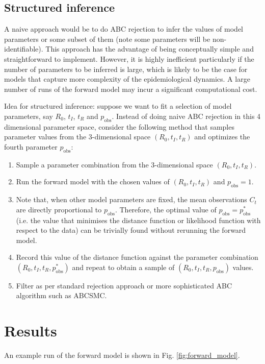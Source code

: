 \documentclass[12pt]{article}
\begin{document}
\subsection*{Structured inference}
A naive approach would be to do ABC rejection to infer the values of model parameters or some subset of them (note some parameters will be non-identifiable). This approach has the advantage of being conceptually simple and straightforward to implement. However, it is highly inefficient particularly if the number of parameters to be inferred is large, which is likely to be the case for models that capture more complexity of the epidemiological dynamics. A large number of runs of the forward model may incur a significant computational cost. 

Idea for structured inference: suppose we want to fit a selection of model parameters, say $R_0$, $t_I$, $t_R$ and $p_\mathrm{obs}$. Instead of doing naive ABC rejection in this 4 dimensional parameter space, consider the following method that samples parameter values from the 3-dimensional space $(R_0,t_I,t_R)$ and optimizes the fourth parameter $p_\mathrm{obs}$:
\begin{enumerate}
    \item Sample a parameter combination from the 3-dimensional space $(R_0,t_I,t_R)$.
    \item Run the forward model with the chosen values of $(R_0,t_I,t_R)$ and $p_\mathrm{obs}=1$.
    \item Note that, when other model parameters are fixed, the mean observations $C_t$ are directly proportional to $p_\mathrm{obs}$. Therefore, the optimal value of $p_\mathrm{obs}=p_\mathrm{obs}^*$ (i.e. the value that minimises the distance function or likelihood function with respect to the data) can be trivially found without rerunning the forward model. 
    \item Record this value of the distance function against the parameter combination $(R_0,t_I,t_R,p_\mathrm{obs}^*)$ and repeat to obtain a sample of $(R_0,t_I,t_R,p_\mathrm{obs})$ values.
    \item Filter as per standard rejection approach or more sophisticated ABC algorithm such as ABCSMC.   
\end{enumerate}









\section*{Results}
An example run of the forward model is shown in Fig. \ref{fig:forward_model}.
\end{document}
